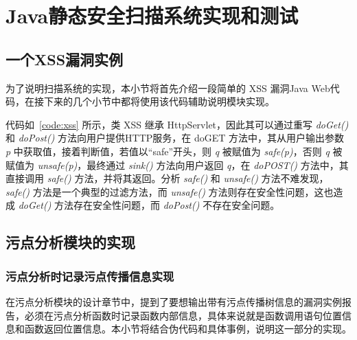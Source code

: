 \chapter{Java静态安全扫描系统实现和测试}
\section{一个XSS漏洞实例}
为了说明扫描系统的实现，本小节将首先介绍一段简单的 XSS 漏洞Java Web代码，在接下来的几个小节中都将使用该代码辅助说明模块实现。

\begin{minipage}[!htbp]{0.9\textwidth}

\end{minipage}

代码如~\ref{code:xss} 所示，类 XSS 继承 HttpServlet，因此其可以通过重写 \textit{doGet()} 和 \textit{doPost()} 方法向用户提供HTTP服务，在 doGET 方法中，其从用户输出参数 \textit{p} 中获取值，接着判断值，若值以“safe”开头，则 \textit{q} 被赋值为 \textit{safe(p)}，否则 \textit{q} 被赋值为 \textit{unsafe(p)}，最终通过 \textit{sink()} 方法向用户返回 \textit{q}，在 \textit{doPOST()} 方法中，其直接调用 \textit{safe()} 方法，并将其返回。分析 \textit{safe()} 和 \textit{unsafe()} 方法不难发现，\textit{safe()} 方法是一个典型的过滤方法，而 \textit{unsafe()} 方法则存在安全性问题，这也造成 \textit{doGet()} 方法存在安全性问题，而 \textit{doPost()} 不存在安全问题。

\section{污点分析模块的实现}\label{sec:taintImp}
\subsection{污点分析时记录污点传播信息实现}
在污点分析模块的设计章节中，提到了要想输出带有污点传播树信息的漏洞实例报告，必须在污点分析函数时记录函数内部信息，具体来说就是函数调用语句位置信息和函数返回位置信息。本小节将结合伪代码和具体事例，说明这一部分的实现。


